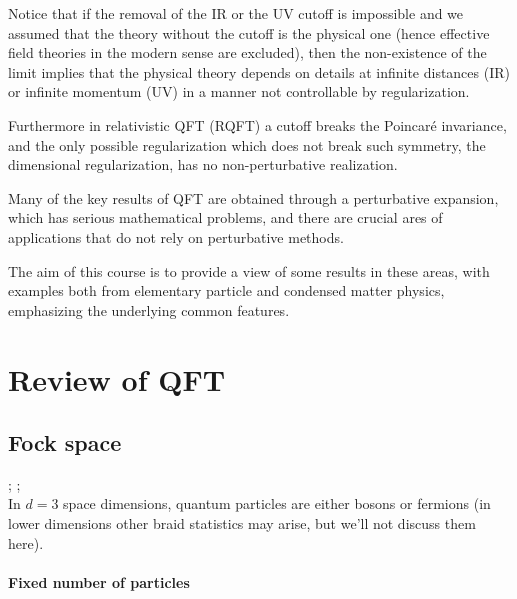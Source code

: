 \documentclass[../main/main.tex]{subfiles}
\begin{document}
Notice that if the removal of the IR or the UV cutoff is impossible and we assumed that the theory without the cutoff is the physical one (hence effective field theories in the modern sense are excluded), then the non-existence of the limit implies that the physical theory depends on details at infinite distances (IR) or infinite momentum (UV) in a manner not controllable by regularization. 

Furthermore in relativistic QFT (RQFT) a cutoff breaks the Poincaré invariance, and the only possible regularization which does not break such symmetry, the dimensional regularization, has no non-perturbative realization. 

Many of the key results of QFT are obtained through a perturbative expansion, which has serious mathematical problems, and there are crucial ares of applications that do not rely on perturbative methods. 

The aim of this course is to provide a view of some results in these areas, with examples both from elementary particle and condensed matter physics, emphasizing the underlying common features. 

\chapter{Review of QFT}
\section{Fock space}

\textsf{\cite{John-W.-Negele:1998aa}; \cite[Chapters 3,4]{Greiner_1996}; \cite[Chapters 1,2]{Bogoliubov:1980}}\\

In $d=3$ space dimensions, quantum particles are either bosons or fermions (in lower dimensions other braid statistics may arise, but we'll not discuss them here). 

\subsubsection{Fixed number of particles}
\end{document}
